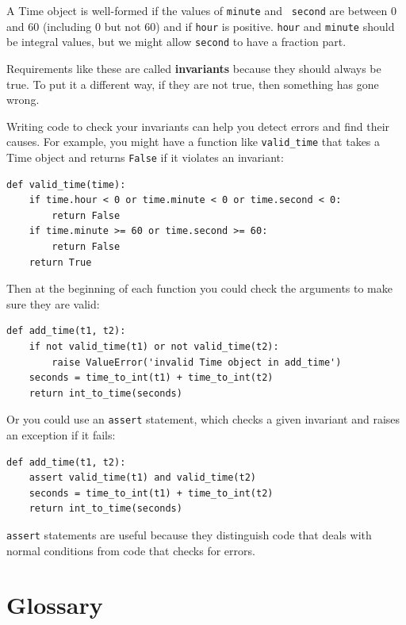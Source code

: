 \documentclass[10pt]{book}
\begin{document}
A Time object is well-formed if the values of {\tt minute} and {\tt
second} are between 0 and 60 (including 0 but not 60) and if 
{\tt hour} is positive.  {\tt hour} and {\tt minute} should be
integral values, but we might allow {\tt second} to have a
fraction part.

Requirements like these are called {\bf invariants} because
they should always be true.  To put it a different way, if they
are not true, then something has gone wrong.

Writing code to check your invariants can help you detect errors
and find their causes.  For example, you might have a function
like \verb"valid_time" that takes a Time object and returns
{\tt False} if it violates an invariant:

\begin{verbatim}
def valid_time(time):
    if time.hour < 0 or time.minute < 0 or time.second < 0:
        return False
    if time.minute >= 60 or time.second >= 60:
        return False
    return True
\end{verbatim}
%
Then at the beginning of each function you could check the
arguments to make sure they are valid:

\begin{verbatim}
def add_time(t1, t2):
    if not valid_time(t1) or not valid_time(t2):
        raise ValueError('invalid Time object in add_time')
    seconds = time_to_int(t1) + time_to_int(t2)
    return int_to_time(seconds)
\end{verbatim}
%
Or you could use an {\tt assert} statement, which checks a given invariant
and raises an exception if it fails:

\begin{verbatim}
def add_time(t1, t2):
    assert valid_time(t1) and valid_time(t2)
    seconds = time_to_int(t1) + time_to_int(t2)
    return int_to_time(seconds)
\end{verbatim}
%
{\tt assert} statements are useful because they distinguish
code that deals with normal conditions from code
that checks for errors.


\section{Glossary}
\end{document}
